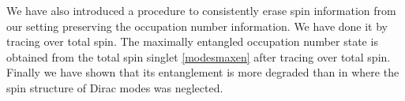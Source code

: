 We have also introduced a procedure to consistently erase spin information from our setting preserving the occupation number information. We have done it by tracing over total spin. The maximally entangled occupation number state is obtained from the total spin singlet \eqref{modesmaxen} after tracing over total spin. Finally we have shown that its entanglement is more degraded than in \cite{AlsingSchul} where the spin structure of Dirac modes was neglected. 


\cleardoublepage
